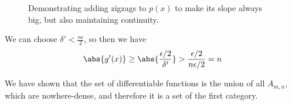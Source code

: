 {{\begin{figure}[H]
  \caption{
    Demonstrating adding zigzags to $p(x)$ to make its slope always big,
    but also maintaining continuity.
  }
  \label{chap8:fig:zigzags_px}
\end{figure}

We can choose $\delta' < \frac{n\epsilon}{2}$,
so then we have 
\begin{equation}
  \abs{g'(x)} \geq \abs{
    \frac{
      \epsilon/2
    }{
      \delta'
    }
  } > \frac{
    \epsilon/2
  }{
    n\epsilon/2
  } = n
\end{equation}
}
We have shown that the set of differentiable functions is 
the union of all $A_{m, n}$, which are nowhere-dense, and therefore 
it is a set of the first category.
}